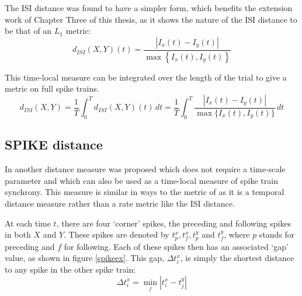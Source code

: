 The ISI distance was found to have a simpler form, which benefits the extension work of Chapter Three of this thesis, as it shows the nature of the ISI distance to be that of an $L_1$ metric:
\begin{equation}
d_{ISI}(X,Y)(t) = \frac{| I_x(t) - I_y(t) |}{\max \left\{ I_x(t), I_y(t)\right\}}
\end{equation}

This time-local measure can be integrated over the length of the trial to give a metric on full spike trains.
\begin{equation}
d_{ISI}(X,Y) = \frac{1}{T}\int_0^T d_{ISI}(X,Y)(t)\,dt = \frac{1}{T}\int_0^T \frac{| I_x(t) - I_y(t) |}{\max \{I_x(t),I_y(t)\}}\, dt
\end{equation}


\subsection{SPIKE distance}
In \citep{KreuzEtAl2011a,KreuzEtAl2012a} another distance measure was proposed which does not require a time-scale parameter and which can also be used as a time-local measure of spike train synchrony.  This measure is similar in ways to the metric of \citet{VictorPurpura1997a} as it is a temporal distance measure rather than a rate metric like the ISI distance.

At each time $t$, there are four \lq{}corner\rq{} spikes,  the preceding and following spikes in both $X$ and $Y$. These spikes are denoted by $t^x_p, t^x_f, t^y_p$ and $t^y_f$, where $p$ stands for preceding and $f$ for following.  Each of these spikes then has an associated \lq{}gap\rq{} value, as shown in figure \ref{spikeex}.  This gap, $\Delta t^x_i$, is simply the shortest distance to any spike in the other spike train:
\begin{equation}
\Delta t^x_i = \min_j | t^x_i - t^y_j |
\end{equation}


